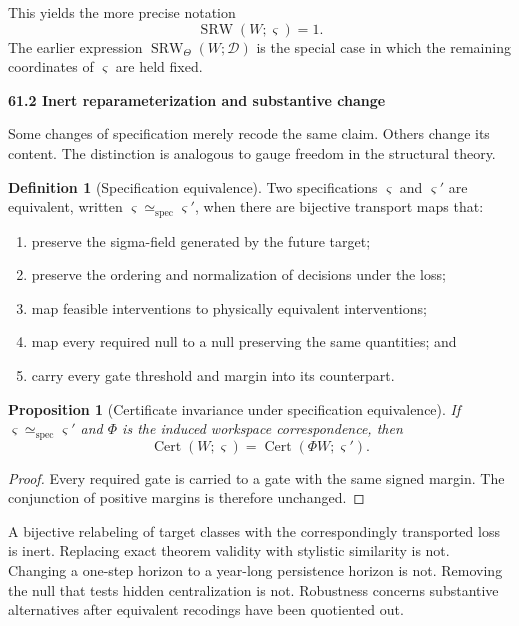\documentclass[11pt,letterpaper]{article}
\newcommand{\SRW}{\operatorname{SRW}}
\newcommand{\subtopic}[1]{%
 \vspace{0.45em}
 {\bfseries\color{AccentColor} #1\par}
}
\theoremstyle{plain}
\newtheorem{proposition}[theorem]{Proposition}
\theoremstyle{definition}
\newtheorem{definition}[theorem]{Definition}
\begin{document}
This yields the more precise notation
\[
\boxed{
\SRW(W;\varsigma)=1.
}
\]
The earlier expression \(\SRW_\Theta(W;\mathcal D)\) is the special case in
which the remaining coordinates of \(\varsigma\) are held fixed.

\subtopic{61.2 Inert reparameterization and substantive change}

Some changes of specification merely recode the same claim. Others change its
content. The distinction is analogous to gauge freedom in the structural
theory.

\begin{definition}[Specification equivalence]\label{def:spec-equivalence}
Two specifications \(\varsigma\) and \(\varsigma'\) are equivalent, written
\(\varsigma\simeq_{\mathrm{spec}}\varsigma'\), when there are bijective
transport maps that:
\begin{enumerate}
\item preserve the sigma-field generated by the future target;
\item preserve the ordering and normalization of decisions under the loss;
\item map feasible interventions to physically equivalent interventions;
\item map every required null to a null preserving the same quantities; and
\item carry every gate threshold and margin into its counterpart.
\end{enumerate}
\end{definition}

\begin{proposition}[Certificate invariance under specification equivalence]
\label{prop:spec-equivalence-invariance}
If \(\varsigma\simeq_{\mathrm{spec}}\varsigma'\) and \(\Phi\) is the induced
workspace correspondence, then
\[
\operatorname{Cert}(W;\varsigma)
=
\operatorname{Cert}(\Phi W;\varsigma').
\]
\end{proposition}

\begin{proof}
Every required gate is carried to a gate with the same signed margin. The
conjunction of positive margins is therefore unchanged.
\end{proof}

A bijective relabeling of target classes with the correspondingly transported
loss is inert. Replacing exact theorem validity with stylistic similarity is
not. Changing a one-step horizon to a year-long persistence horizon is not.
Removing the null that tests hidden centralization is not. Robustness concerns
substantive alternatives after equivalent recodings have been quotiented out.
\end{document}
